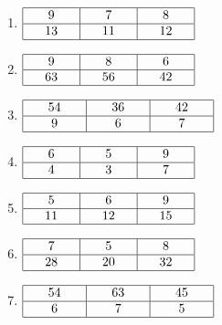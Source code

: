 \documentclass[12 pt]{extarticle}
\theoremstyle{plain}
\begin{document}
\begin{enumerate}
	\item $\renewcommand{\arraystretch}{1}
\begin{array}{|c|c|c|}
\hline
\phantom{000}9\phantom{000} & \phantom{000}7\phantom{000} & \phantom{000}8\phantom{000}\\
\hline
13 & 11 & 12\\
\hline
\end{array}
\renewcommand{\arraystretch}{1}$

	\item $\renewcommand{\arraystretch}{1}
\begin{array}{|c|c|c|}
\hline
\phantom{000}9\phantom{000} & \phantom{000}8\phantom{000} & \phantom{000}6\phantom{000}\\
\hline
63 & 56 & 42\\
\hline
\end{array}
\renewcommand{\arraystretch}{1}$

	\item $\renewcommand{\arraystretch}{1}
\begin{array}{|c|c|c|}
\hline
\phantom{000}54\phantom{000} & \phantom{000}36\phantom{000} & \phantom{000}42\phantom{000}\\
\hline
9 & 6 & 7\\
\hline
\end{array}
\renewcommand{\arraystretch}{1}$

	\item $\renewcommand{\arraystretch}{1}
\begin{array}{|c|c|c|}
\hline
\phantom{000}6\phantom{000} & \phantom{000}5\phantom{000} & \phantom{000}9\phantom{000}\\
\hline
4 & 3 & 7\\
\hline
\end{array}
\renewcommand{\arraystretch}{1}$

	\item $\renewcommand{\arraystretch}{1}
\begin{array}{|c|c|c|}
\hline
\phantom{000}5\phantom{000} & \phantom{000}6\phantom{000} & \phantom{000}9\phantom{000}\\
\hline
11 & 12 & 15\\
\hline
\end{array}
\renewcommand{\arraystretch}{1}$

	\item $\renewcommand{\arraystretch}{1}
\begin{array}{|c|c|c|}
\hline
\phantom{000}7\phantom{000} & \phantom{000}5\phantom{000} & \phantom{000}8\phantom{000}\\
\hline
28 & 20 & 32\\
\hline
\end{array}
\renewcommand{\arraystretch}{1}$

	\item $\renewcommand{\arraystretch}{1}
\begin{array}{|c|c|c|}
\hline
\phantom{000}54\phantom{000} & \phantom{000}63\phantom{000} & \phantom{000}45\phantom{000}\\
\hline
6 & 7 & 5\\
\hline
\end{array}
\renewcommand{\arraystretch}{1}$
\end{enumerate}
\end{document}
